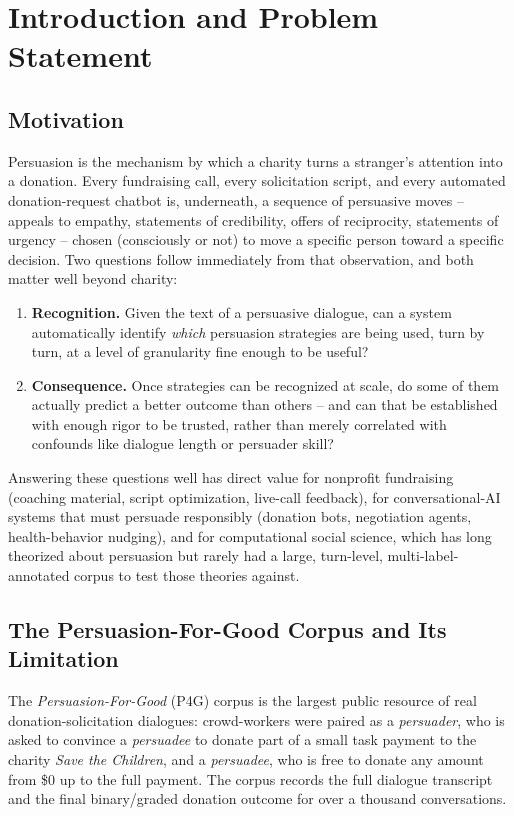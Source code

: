 \chapter{Introduction and Problem Statement}
\label{ch:problem}

\section{Motivation}

Persuasion is the mechanism by which a charity turns a stranger's attention
into a donation. Every fundraising call, every solicitation script, and every
automated donation-request chatbot is, underneath, a sequence of persuasive
moves -- appeals to empathy, statements of credibility, offers of
reciprocity, statements of urgency -- chosen (consciously or not) to move a
specific person toward a specific decision. Two questions follow immediately
from that observation, and both matter well beyond charity:

\begin{enumerate}
\item \textbf{Recognition.} Given the text of a persuasive dialogue, can a
  system automatically identify \emph{which} persuasion strategies are being
  used, turn by turn, at a level of granularity fine enough to be useful?
\item \textbf{Consequence.} Once strategies can be recognized at scale, do
  some of them actually predict a better outcome than others -- and can that
  be established with enough rigor to be trusted, rather than merely
  correlated with confounds like dialogue length or persuader skill?
\end{enumerate}

Answering these questions well has direct value for nonprofit fundraising
(coaching material, script optimization, live-call feedback), for
conversational-AI systems that must persuade responsibly (donation bots,
negotiation agents, health-behavior nudging), and for computational social
science, which has long theorized about persuasion \citep{cialdini1984influence}
but rarely had a large, turn-level, multi-label-annotated corpus to test
those theories against.

\section{The Persuasion-For-Good Corpus and Its Limitation}

The \emph{Persuasion-For-Good} (P4G) corpus \citep{wang2019persuasion} is the
largest public resource of real donation-solicitation dialogues: crowd-workers
were paired as a \emph{persuader}, who is asked to convince a
\emph{persuadee} to donate part of a small task payment to the charity
\emph{Save the Children}, and a \emph{persuadee}, who is free to donate any
amount from \$0 up to the full payment. The corpus records the full dialogue
transcript and the final binary/graded donation outcome for over a thousand
conversations.

